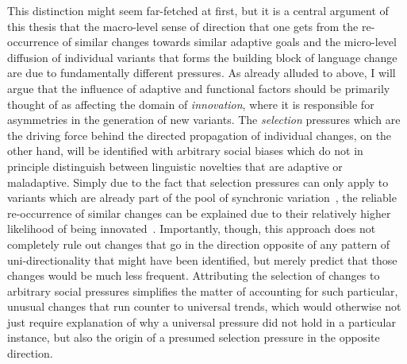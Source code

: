 This distinction might seem far-fetched at first, but it is a central argument of this thesis that the macro-level sense of direction that one gets from the re-occurrence of similar changes towards similar adaptive goals and the micro-level diffusion of individual variants that forms the building block of language change are due to fundamentally different pressures.
As already alluded to above, I will argue that the influence of adaptive and functional factors should be primarily thought of as affecting the domain of \emph{innovation}, where it is responsible for asymmetries in the generation of new variants. The \emph{selection} pressures which are the driving force behind the directed propagation of individual changes, on the other hand, will be identified with arbitrary social biases which do not in principle distinguish between linguistic novelties that are adaptive or maladaptive.
Simply due to the fact that selection pressures can only apply to variants which are already part of the pool of synchronic variation~\citep{Ohala1989}, the reliable re-occurrence of similar changes can be explained due to their relatively higher likelihood of being innovated~\citep{Joseph2013}. Importantly, though, this approach does not completely rule out changes that go in the direction opposite of any pattern of uni-directionality that might have been identified, but merely predict that those changes would be much less frequent. Attributing the selection of changes to arbitrary social pressures simplifies the matter of accounting for such particular, unusual changes that run counter to universal trends, which would otherwise not just require explanation of why a universal pressure did not hold in a particular instance, but also the origin of a presumed selection pressure in the opposite direction.

